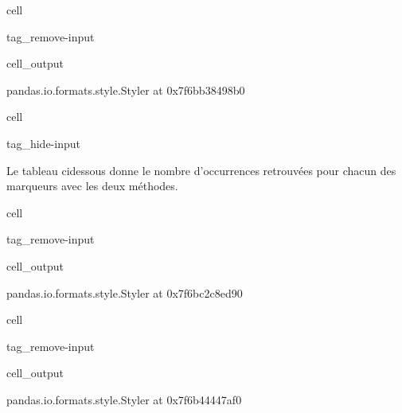 \documentclass[letterpaper,10pt,english]{jupyterBook}
\begin{document}
\begin{sphinxuseclass}{cell}
\begin{sphinxuseclass}{tag_remove-input}\begin{sphinxVerbatimOutput}

\begin{sphinxuseclass}{cell_output}
\begin{sphinxVerbatim}[commandchars=\\\{\}]
\PYGZlt{}pandas.io.formats.style.Styler at 0x7f6bb38498b0\PYGZgt{}
\end{sphinxVerbatim}

\end{sphinxuseclass}\end{sphinxVerbatimOutput}

\end{sphinxuseclass}
\end{sphinxuseclass}
\begin{sphinxuseclass}{cell}
\begin{sphinxuseclass}{tag_hide-input}
\end{sphinxuseclass}
\end{sphinxuseclass}
\sphinxAtStartPar
Le tableau ci\sphinxhyphen{}dessous donne le nombre d’occurrences retrouvées pour chacun des marqueurs avec les deux méthodes.

\begin{sphinxuseclass}{cell}
\begin{sphinxuseclass}{tag_remove-input}\begin{sphinxVerbatimOutput}

\begin{sphinxuseclass}{cell_output}
\begin{sphinxVerbatim}[commandchars=\\\{\}]
\PYGZlt{}pandas.io.formats.style.Styler at 0x7f6bc2c8ed90\PYGZgt{}
\end{sphinxVerbatim}

\end{sphinxuseclass}\end{sphinxVerbatimOutput}

\end{sphinxuseclass}
\end{sphinxuseclass}
\begin{sphinxuseclass}{cell}
\begin{sphinxuseclass}{tag_remove-input}\begin{sphinxVerbatimOutput}

\begin{sphinxuseclass}{cell_output}
\begin{sphinxVerbatim}[commandchars=\\\{\}]
\PYGZlt{}pandas.io.formats.style.Styler at 0x7f6b44447af0\PYGZgt{}
\end{sphinxVerbatim}

\end{sphinxuseclass}\end{sphinxVerbatimOutput}

\end{sphinxuseclass}
\end{sphinxuseclass}
\sphinxstepscope
\end{document}
